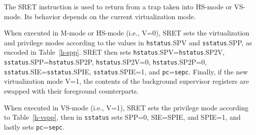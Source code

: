 The SRET instruction is used to return from a trap taken into HS-mode or
VS-mode.  Its behavior depends on the current virtualization mode.

When executed in M-mode or HS-mode (i.e., V=0), SRET sets the virtualization
and privilege modes according to the values in {\tt hstatus}.SPV and
{\tt sstatus}.SPP, as encoded in Table~\ref{h-spp}.
SRET then sets {\tt hstatus}.SPV={\tt hstatus}.SP2V,
{\tt sstatus}.SPP={\tt hstatus}.SP2P, {\tt hstatus}.SP2V=0,
{\tt hstatus}.SP2P=0, {\tt sstatus}.SIE={\tt sstatus}.SPIE,
{\tt sstatus}.SPIE=1, and {\tt pc}={\tt sepc}.
Finally, if the new virtualization mode V=1, the contents of the background
supervisor registers are swapped with their foreground counterparts.

When executed in VS-mode (i.e., V=1), SRET sets the privilege mode according to
Table~\ref{h-vspp}, then in {\tt sstatus} sets SPP=0, SIE=SPIE, and SPIE=1, and
lastly sets {\tt pc}={\tt sepc}.
